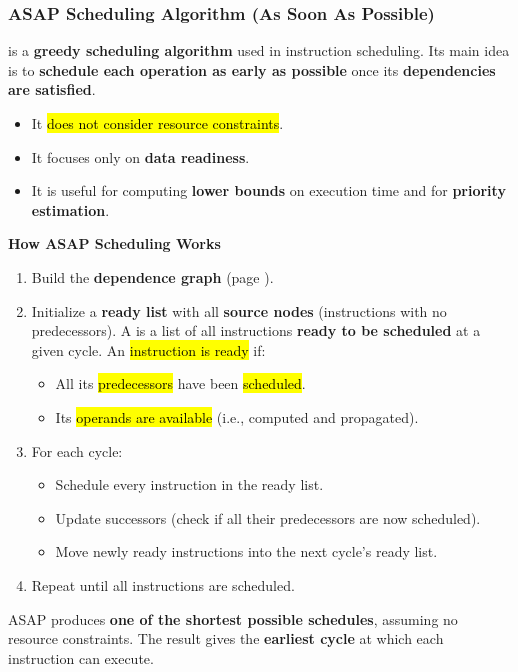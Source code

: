 \subsubsection{ASAP Scheduling Algorithm (As Soon As Possible)}\label{subsubsection: ASAP Scheduling Algorithm}

 is a \textbf{greedy scheduling algorithm} used in instruction scheduling. Its main idea is to \textbf{schedule each operation as early as possible} once its \textbf{dependencies are satisfied}.
\begin{itemize}
    \item It \hl{does not consider resource constraints}.
    \item It focuses only on \textbf{data readiness}.
    \item It is useful for computing \textbf{lower bounds} on execution time and for \textbf{priority estimation}.
\end{itemize}

\begin{flushleft}
    \textcolor{Green3}{ \textbf{How ASAP Scheduling Works}}
\end{flushleft}
\begin{enumerate}
    \item Build the \textbf{dependence graph} (page \pageref{subsubsection: Dependence Graph and Critical Path}).
    \item Initialize a \textbf{ready list} with all \textbf{source nodes} (instructions with no predecessors). A  is a list of all instructions \textbf{ready to be scheduled} at a given cycle. An \hl{instruction is ready} if:
    \begin{itemize}
        \item All its \hl{predecessors} have been \hl{scheduled}.
        \item Its \hl{operands are available} (i.e., computed and propagated).
    \end{itemize}
    \item For each cycle:
    \begin{itemize}
        \item Schedule every instruction in the ready list.
        \item Update successors (check if all their predecessors are now scheduled).
        \item Move newly ready instructions into the next cycle's ready list.
    \end{itemize}
    \item Repeat until all instructions are scheduled.
\end{enumerate}
ASAP produces \textbf{one of the shortest possible schedules}, assuming no resource constraints. The result gives the \textbf{earliest cycle} at which each instruction can execute.

